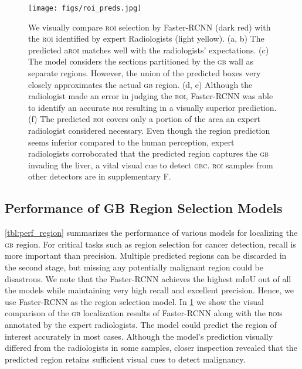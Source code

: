 \documentclass[10pt,twocolumn,letterpaper]{article}
\def\gbc{\textsc{gbc}\xspace}
\def\gb{\textsc{gb}\xspace}
\def\roi{\textsc{roi}\xspace}
\def\rois{\textsc{roi}s\xspace}
\begin{document}
\begin{table}[t]
	\centering
	\scriptsize
{}
	\caption{Comparison of the \gb region selection models. We reported 10-fold cross validation (Mean$\pm$SD) of the metrics.}
\label{tbl:perf_region}
\end{table}
\begin{figure}[t]
	\centering
	\texttt{[image: figs/roi\_preds.jpg]}
	\caption{We visually compare \roi selection by Faster-RCNN (dark red) with the \roi identified by expert Radiologists (light yellow). (a, b) The predicted a\roi matches well with the radiologists' expectations. (c) The model considers the sections partitioned by the \gb wall as separate regions. However, the union of the predicted boxes very closely approximates the actual \gb region. (d, e) Although the radiologist made an error in judging the \roi, Faster-RCNN was able to identify an accurate \roi resulting in a visually superior prediction. (f) The predicted \roi covers only a portion of the area an expert radiologist considered necessary. Even though the region prediction seems inferior compared to the human perception, expert radiologists corroborated that the predicted region captures the \gb invading the liver, a vital visual cue to detect \gbc. \roi samples from other detectors are in supplementary F.}
\label{fig:region_vis}
\end{figure}
\subsection{Performance of GB Region Selection Models}
\cref{tbl:perf_region} summarizes the performance of various models for localizing the \gb region. For critical tasks such as region selection for cancer detection, recall is more important than precision. Multiple predicted regions can be discarded in the second stage, but missing any potentially malignant region could be disastrous. We note that the Faster-RCNN achieves the highest mIoU out of all the models while maintaining very high recall and excellent precision. Hence, we use Faster-RCNN as the region selection model. In \cref{fig:region_vis} we show the visual comparison of the \gb localization results of Faster-RCNN along with the \rois annotated by the expert radiologists. The model could predict the region of interest accurately in most cases. Although the model's prediction visually differed from the radiologists in some samples, closer inspection revealed that the predicted region retains sufficient visual cues to detect malignancy. 
\end{document}
